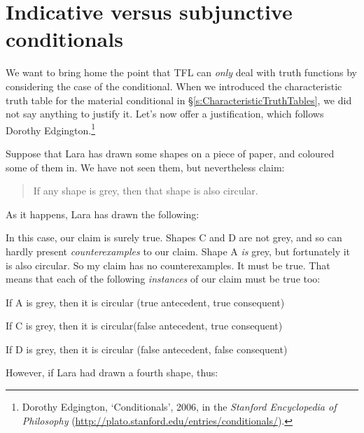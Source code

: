 \section{Indicative versus subjunctive conditionals}\label{s:IndicativeSubjunctive}
We want to bring home the point that TFL can \emph{only} deal with truth functions by considering the case of the conditional. When we introduced the characteristic truth table for the material conditional in \S\ref{s:CharacteristicTruthTables}, we did not say anything to justify it. Let's now offer a justification, which follows Dorothy Edgington.\footnote{Dorothy Edgington, `Conditionals', 2006, in the \emph{Stanford Encyclopedia of Philosophy} (\url{http://plato.stanford.edu/entries/conditionals/}).} 

Suppose that Lara has drawn some shapes on a piece of paper, and coloured some of them in. We have not seen them, but nevertheless claim:
	\begin{quote}
		If any shape is grey, then that shape is also circular.
	\end{quote}
As it happens, Lara has drawn the following:
\begin{center}
\end{center}
In this case, our claim is surely true.  Shapes C and D are not grey, and so can hardly present \emph{counterexamples} to our claim. Shape A \emph{is} grey, but fortunately it is also circular. So my claim has no counterexamples. It must be true. That means that each of the following \emph{instances} of our claim must be true too:
	\begin{ebullet}
		\item If A is grey, then it is circular \hfill (true antecedent, true consequent)
		\item If C is grey, then it is circular\hfill (false antecedent, true consequent)
		\item If D is grey, then it is circular \hfill (false antecedent, false consequent)
	\end{ebullet}
However, if Lara had drawn a fourth shape, thus:
\begin{center}
\end{center}
